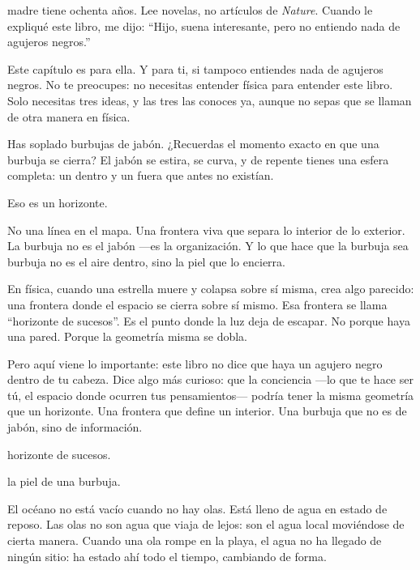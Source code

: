 \mainmatter
{}
\noindent {} madre tiene ochenta años. Lee novelas, no artículos de \emph{Nature}. Cuando le expliqué este libro, me dijo: “Hijo, suena interesante, pero no entiendo nada de agujeros negros.”

Este capítulo es para ella. Y para ti, si tampoco entiendes nada de agujeros negros. No te preocupes: no necesitas entender física para entender este libro. Solo necesitas tres ideas, y las tres las conoces ya, aunque no sepas que se llaman de otra manera en física.

\noindent Has soplado burbujas de jabón. ¿Recuerdas el momento exacto en que una burbuja se cierra? El jabón se estira, se curva, y de repente tienes una esfera completa: un dentro y un fuera que antes no existían.

Eso es un horizonte.

No una línea en el mapa. Una frontera viva que separa lo interior de lo exterior. La burbuja no es el jabón —es la organización. Y lo que hace que la burbuja sea burbuja no es el aire dentro, sino la piel que lo encierra.

En física, cuando una estrella muere y colapsa sobre sí misma, crea algo parecido: una frontera donde el espacio se cierra sobre sí mismo. Esa frontera se llama “horizonte de sucesos”. Es el punto donde la luz deja de escapar. No porque haya una pared. Porque la geometría misma se dobla.

Pero aquí viene lo importante: este libro no dice que haya un agujero negro dentro de tu cabeza. Dice algo más curioso: que la conciencia —lo que te hace ser tú, el espacio donde ocurren tus pensamientos— podría tener la misma geometría que un horizonte. Una frontera que define un interior. Una burbuja que no es de jabón, sino de información.

\begin{fisica}
 horizonte de sucesos.

 la piel de una burbuja.
\end{fisica}
\noindent El océano no está vacío cuando no hay olas. Está lleno de agua en estado de reposo. Las olas no son agua que viaja de lejos: son el agua local moviéndose de cierta manera. Cuando una ola rompe en la playa, el agua no ha llegado de ningún sitio: ha estado ahí todo el tiempo, cambiando de forma.

